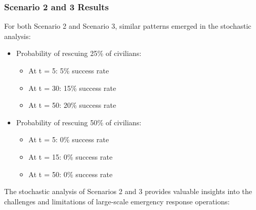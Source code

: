 \subsubsection{Scenario 2 and 3 Results}
For both Scenario 2 and Scenario 3, similar patterns emerged in the stochastic analysis:

\begin{itemize}
	\item Probability of rescuing 25\% of civilians:
	\begin{itemize}
		\item At t = 5: 5\% success rate
		\item At t = 30: 15\% success rate
		\item At t = 50: 20\% success rate
	\end{itemize}
	
	\item Probability of rescuing 50\% of civilians:
	\begin{itemize}
		\item At t = 5: 0\% success rate
		\item At t = 15: 0\% success rate
		\item At t = 50: 0\% success rate
	\end{itemize}
\end{itemize}

The stochastic analysis of Scenarios 2 and 3 provides valuable insights into the challenges and limitations of large-scale emergency response operations:

